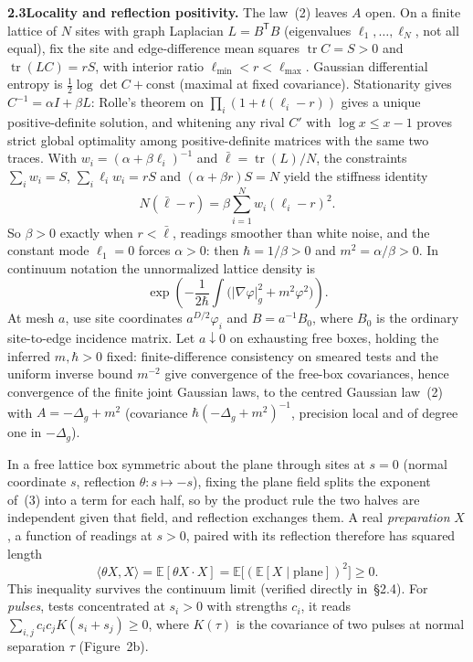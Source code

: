 \documentclass[10pt,a4paper]{article}
\newcommand{\E}{\mathbb{E}}
\newcommand{\tr}{\operatorname{tr}}
\begin{document}
\vspace{3pt}
\noindent\textbf{2.3\enspace Locality and reflection positivity.} The law~(2) leaves $A$ open. On a finite lattice of $N$ sites with graph Laplacian $L = B^{\mathsf{T}}B$ (eigenvalues $\ell_1,\dots,\ell_N$, not all equal), fix the site and edge-difference mean squares $\tr C = S > 0$ and $\tr(LC) = rS$, with interior ratio $\ell_{\min} < r < \ell_{\max}$. Gaussian differential entropy is $\frac{1}{2}\log\det C + \text{const}$ (maximal at fixed covariance). Stationarity gives $C^{-1} = \alpha I + \beta L$: Rolle's theorem on $\prod_i(1 + t(\ell_i - r))$ gives a unique positive-definite solution, and whitening any rival $C'$ with $\log x \le x - 1$ proves strict global optimality among positive-definite matrices with the same two traces. With $w_i = (\alpha + \beta\ell_i)^{-1}$ and $\bar\ell = \tr(L)/N$, the constraints $\sum_i w_i = S$, $\sum_i \ell_i w_i = rS$ and $(\alpha + \beta r)S = N$ yield the stiffness identity
\begin{equation*}
  N(\bar\ell - r) = \beta \sum_{i=1}^N w_i(\ell_i - r)^2.
\end{equation*}
So $\beta > 0$ exactly when $r < \bar\ell$, readings smoother than white noise, and the constant mode $\ell_1 = 0$ forces $\alpha > 0$: then $\hbar = 1/\beta > 0$ and $m^2 = \alpha/\beta > 0$. In continuum notation the unnormalized lattice density is
\begin{equation}
  \exp\!\left(-\frac{1}{2\hbar}\int\bigl(|\nabla\varphi|_g^2 + m^2\varphi^2\bigr)\right).
\end{equation}
At mesh $a$, use site coordinates $a^{D/2}\varphi_i$ and $B = a^{-1}B_0$, where $B_0$ is the ordinary site-to-edge incidence matrix. Let $a \downarrow 0$ on exhausting free boxes, holding the inferred $m, \hbar > 0$ fixed: finite-difference consistency on smeared tests and the uniform inverse bound $m^{-2}$ give convergence of the free-box covariances, hence convergence of the finite joint Gaussian laws, to the centred Gaussian law~(2) with $A = -\Delta_g + m^2$ (covariance $\hbar(-\Delta_g + m^2)^{-1}$, precision local and of degree one in $-\Delta_g$).

In a free lattice box symmetric about the plane through sites at $s = 0$ (normal coordinate $s$, reflection $\theta: s \mapsto -s$), fixing the plane field splits the exponent of~(3) into a term for each half, so by the product rule the two halves are independent given that field, and reflection exchanges them. A real \textit{preparation} $X$, a function of readings at $s > 0$, paired with its reflection therefore has squared length
\begin{equation}
  \langle\theta X, X\rangle = \E[\theta X \cdot X] = \E\bigl[(\E[X \mid \text{plane}])^2\bigr] \ge 0.
\end{equation}
This inequality survives the continuum limit (verified directly in~\S2.4). For \textit{pulses}, tests concentrated at $s_i > 0$ with strengths $c_i$, it reads $\sum_{i,j} c_i c_j K(s_i + s_j) \ge 0$, where $K(\tau)$ is the covariance of two pulses at normal separation $\tau$ (Figure~2b).
\end{document}
